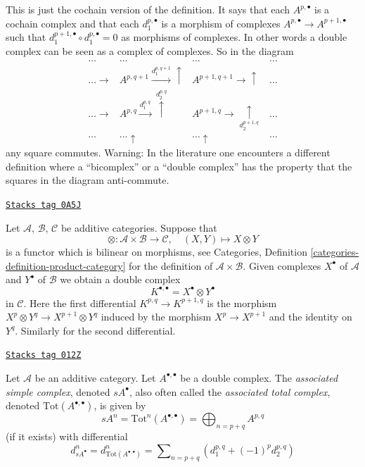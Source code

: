 This is just the cochain version of the definition.
It says that each $A^{p, \bullet}$ is a cochain complex
and that each $d_1^{p, \bullet}$ is a morphism of complexes
$A^{p, \bullet} \to A^{p + 1, \bullet}$ such that
$d_1^{p + 1, \bullet} \circ d_1^{p, \bullet} = 0$ as morphisms
of complexes. In other words a double complex can be seen as
a complex of complexes. So in the diagram
$$
\begin{array}{cccc}\ldots & \ldots & \ldots & \ldots \\ \ldots \longrightarrow & A^{p, q + 1} \overset{d_1^{p, q + 1}}{\longrightarrow}\uparrow & A^{p + 1, q + 1} \longrightarrow\uparrow & \ldots \\ \ldots \longrightarrow & A^{p, q} \overset{d_1^{p, q}}{\longrightarrow}\overset{d_2^{p, q}}{\uparrow} & A^{p + 1, q} \longrightarrow\underset{d_2^{p + 1, q}}{\uparrow} & \ldots \\ \ldots & \ldots \uparrow & \ldots \uparrow & \ldots\end{array}
$$
any square commutes.
Warning: In the literature one encounters a different definition
where a ``bicomplex'' or  a ``double complex'' has the property that
the squares in the diagram anti-commute.

\begin{example}
\label{homology-example-double-complex-as-tensor-product-of}
\href{https://stacks.math.columbia.edu/tag/0A5J}{\texttt{Stacks tag 0A5J}}

Let $\mathcal{A}$, $\mathcal{B}$, $\mathcal{C}$ be additive categories.
Suppose that
$$
\otimes : \mathcal{A} \times \mathcal{B} \longrightarrow \mathcal{C},
\quad
(X, Y) \longmapsto X \otimes Y
$$
is a functor which is bilinear on morphisms, see
Categories, Definition \ref{categories-definition-product-category}
for the definition of $\mathcal{A} \times \mathcal{B}$.
Given complexes $X^\bullet$ of $\mathcal{A}$ and $Y^\bullet$
of $\mathcal{B}$ we obtain a double complex
$$
K^{\bullet, \bullet} = X^\bullet \otimes Y^\bullet
$$
in $\mathcal{C}$. Here the first differential
$K^{p, q} \to K^{p + 1, q}$ is the morphism
$X^p \otimes Y^q \to X^{p + 1} \otimes Y^q$ induced by
the morphism $X^p \to X^{p + 1}$ and the identity on $Y^q$.
Similarly for the second differential.
\end{example}

\begin{definition}
\label{homology-definition-associated-simple-complex}
\href{https://stacks.math.columbia.edu/tag/012Z}{\texttt{Stacks tag 012Z}}

Let $\mathcal{A}$ be an additive category.
Let $A^{\bullet, \bullet}$ be a double complex.
The {\it associated simple complex}, denoted $sA^\bullet$, also
often called the {\it associated total complex}, denoted
$\text{Tot}(A^{\bullet, \bullet})$, is
given by
$$
sA^n = \text{Tot}^n(A^{\bullet, \bullet}) =
\bigoplus\nolimits_{n = p + q} A^{p, q}
$$
(if it exists) with differential
$$
d_{sA^\bullet}^n = d_{\text{Tot}(A^{\bullet, \bullet})}^n =
\sum\nolimits_{n = p + q} (d_1^{p, q} + (-1)^p d_2^{p, q})
$$
\end{definition}

